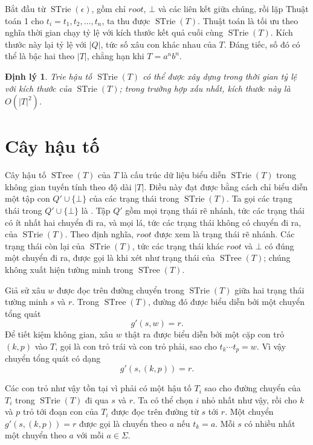 \documentclass[11pt]{article}
\newtheorem{theorem}{Định lý}
\newcommand{\eps}{\epsilon}
\newcommand{\STrie}{\operatorname{STrie}}
\newcommand{\STree}{\operatorname{STree}}
\begin{document}
Bắt đầu từ $\STrie(\eps)$, gồm chỉ $\mathit{root}$, $\bot$ và các liên kết
giữa chúng, rồi lặp Thuật toán 1 cho $t_i=t_1,t_2,\ldots,t_n$, ta thu được
$\STrie(T)$. Thuật toán là tối ưu theo nghĩa thời gian chạy tỷ lệ với kích
thước kết quả cuối cùng $\STrie(T)$. Kích thước này lại tỷ lệ với $|Q|$, tức
số xâu con khác nhau của $T$. Đáng tiếc, số đó có thể là bậc hai theo $|T|$,
chẳng hạn khi $T=a^nb^n$.

\begin{theorem}
Trie hậu tố $\STrie(T)$ có thể được xây dựng trong thời gian tỷ lệ với kích
thước của $\STrie(T)$; trong trường hợp xấu nhất, kích thước này là
$O(|T|^2)$.
\end{theorem}

\section{Cây hậu tố}

Cây hậu tố $\STree(T)$ của $T$ là cấu trúc dữ liệu biểu diễn $\STrie(T)$ trong
không gian tuyến tính theo độ dài $|T|$. Điều này đạt được bằng cách chỉ biểu
diễn một tập con $Q'\cup\{\bot\}$ của các trạng thái trong $\STrie(T)$. Ta gọi
các trạng thái trong $Q'\cup\{\bot\}$ là . Tập
$Q'$ gồm mọi trạng thái rẽ nhánh, tức các trạng thái có ít nhất hai chuyển đi
ra, và mọi lá, tức các trạng thái không có chuyển đi ra, của $\STrie(T)$. Theo
định nghĩa, $\mathit{root}$ được xem là trạng thái rẽ nhánh. Các trạng thái
còn lại của $\STrie(T)$, tức các trạng thái khác $\mathit{root}$ và $\bot$ có
đúng một chuyển đi ra, được gọi là  khi xét như trạng
thái của $\STree(T)$; chúng không xuất hiện tường minh trong $\STree(T)$.

Giả sử xâu $w$ được đọc trên đường chuyển trong $\STrie(T)$ giữa hai trạng
thái tường minh $s$ và $r$. Trong $\STree(T)$, đường đó được biểu diễn bởi một
chuyển tổng quát
\[
  g'(s,w)=r.
\]
Để tiết kiệm không gian, xâu $w$ thật ra được biểu diễn bởi một cặp con trỏ
$(k,p)$ vào $T$, gọi là con trỏ trái và con trỏ phải, sao cho
$t_k\cdots t_p=w$. Vì vậy chuyển tổng quát có dạng
\[
  g'(s,(k,p))=r.
\]

Các con trỏ như vậy tồn tại vì phải có một hậu tố $T_i$ sao cho đường chuyển
của $T_i$ trong $\STrie(T)$ đi qua $s$ và $r$. Ta có thể chọn $i$ nhỏ nhất như
vậy, rồi cho $k$ và $p$ trỏ tới đoạn con của $T_i$ được đọc trên đường từ $s$
tới $r$. Một chuyển $g'(s,(k,p))=r$ được gọi là chuyển theo $a$ nếu $t_k=a$.
Mỗi $s$ có nhiều nhất một chuyển theo $a$ với mỗi $a\in\Sigma$.
\end{document}
